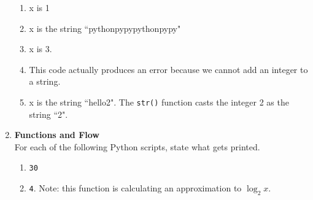 \documentclass{article}
\begin{document}
\begin{enumerate}
\begin{enumerate}
\item 

x is 1
\end{enumerate}

\begin{enumerate}
\setcounter{enumii}{1}
\item 
x is the string ``pythonpypypythonpypy"
\end{enumerate}

\begin{enumerate}
\setcounter{enumii}{2}
\item 
x is 3.
\end{enumerate}

\begin{enumerate}
\setcounter{enumii}{3}
\item 
This code actually produces an error because we cannot add an integer to a string.
\end{enumerate}

\begin{enumerate}
\setcounter{enumii}{4}
\item 
x is the string ``hello2".  The \texttt{str()} function casts the integer 2 as the string ``2".
\end{enumerate}


\item \textbf{Functions and Flow} \\
For each of the following Python scripts, state what gets printed.

\begin{enumerate}
\item 
\texttt{30}
\end{enumerate}

\begin{enumerate}
\setcounter{enumii}{1}
\item 
\texttt{4}.  Note: this function is calculating an approximation to $\log_2x$.
\end{enumerate}


\end{enumerate}
\end{document}
